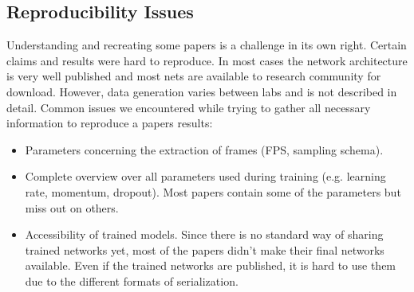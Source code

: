 \subsection*{Reproducibility Issues}
Understanding and recreating some papers is a challenge in its own right. Certain claims and results were hard to reproduce. In most cases the network architecture is very well published and most nets are available to research community for download. However, data generation varies between labs and is not described in detail.
Common issues we encountered while trying to gather all necessary information to reproduce a papers results:
\begin{itemize}
	\item Parameters concerning the extraction of frames (FPS, sampling schema).
	\item Complete overview over all parameters used during training (e.g. learning rate, momentum, dropout). Most papers contain some of the parameters but miss out on others.
	\item Accessibility of trained models. Since there is no standard way of sharing trained networks yet, most of the papers didn't make their final networks available. Even if the trained networks are published, it is hard to use them due to the different formats of serialization.
\end{itemize}